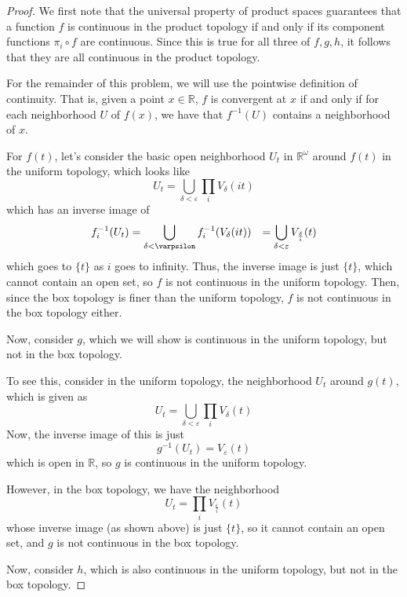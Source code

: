 \documentclass[fontsize=11pt]{scrartcl} %
\numberwithin{equation}{section} %
\numberwithin{figure}{section} %
\numberwithin{table}{section} %
\newcommand{\R}{\mathbb{R}}
\begin{document}
\begin{proof}
We first note that the universal property of product spaces guarantees that a
    function $f$ is continuous in the product topology if and only if its
    component functions $\pi_i\circ f$ are continuous.  Since this is true for
    all three of $f,g,h$, it follows that they are all continuous in the product
    topology.

For the remainder of this problem, we will use the pointwise definition of
    continuity. That is, given a point $x\in\R$, $f$ is convergent at $x$ if and
    only if for each neighborhood $U$ of $f(x)$, we have that $f^{-1}(U)$
    contains a neighborhood of $x$.

For $f(t)$, let's consider the basic open neighborhood $U_t$ in
    $\R^{\omega}$ around $f(t)$ in the uniform topology, which looks like
    \[
        U_t = \bigcup_{\delta<\varepsilon} \prod_i V_{\delta}(it)
    \]
    which has an inverse image of
    \[
        \begin{aligned}
            f_i^{-1}(U_t) &= \bigcup_{\delta<\varpsilon}
            f_i^{-1}(V_{\delta}(it))
                        &= \bigcup_{\delta<\varepsilon}V_{\frac{\delta}{i}}(t)
        \end{aligned}
    \]
    which goes to $\{t\}$ as $i$ goes to infinity. Thus, the inverse image is
    just $\{t\}$, which cannot contain an open set, so $f$ is not continuous
    in the uniform topology. Then, since the box topology is finer than
    the uniform topology, $f$ is not continuous in the box topology either.

    Now, consider $g$, which we will show is continuous in the uniform
    topology, but not in the box topology.

    To see this, consider in the uniform topology, the neighborhood $U_t$
    around $g(t)$, which is given as
    \[
        U_t = \bigcup_{\delta<\varepsilon} \prod_i V_{\delta}(t)
    \]
    Now, the inverse image of this is just
    \[
    g^{-1}(U_t) = V_{\varepsilon}(t)
    \]
    which is open in $\R$, so $g$ is continuous in the uniform topology.

    However, in the box topology, we have the neighborhood
    \[
        U_t = \prod_i V_{\frac{\varepsilon}{i}}(t)
    \]
    whose inverse image (as shown above) is just $\{t\}$, so it cannot contain
    an open set, and $g$ is not continuous in the box topology.

    Now, consider $h$, which is also continuous in the uniform
    topology, but not in the box topology.
    

\end{proof}
\end{document}
